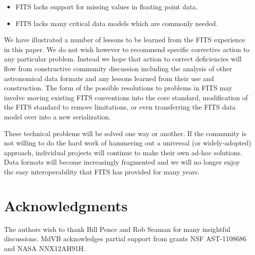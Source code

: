 \documentclass[final,authoryear,5p,times,twocolumn]{elsarticle}
\begin{document}
{{\begin{itemize}
\item FITS lacks support for missing values in floating point data.

\item FITS lacks many critical data models which are commonly needed.

\end{itemize}


We have illustrated a number of lessons to be learned from the FITS experience
in this paper. We do not wish however to recommend specific corrective action 
to any particular problem. Instead we hope that action to correct deficiencies 
will flow from constructive community discussion including the analysis of
other astronomical data formats and any lessons learned from their use
and construction.
The form of the possible resolutions to problems in FITS may involve moving 
existing FITS conventions into the core standard, modification of the FITS 
standard to remove limitations, or even transferring the FITS data model over
into a new serialization. 

These technical problems will be solved one way or another. If the
community is not willing to do the hard work of hammering out a
universal (or widely-adopted) approach, individual projects will
continue to make their own ad-hoc solutions. Data formats will become
increasingly fragmented and we will no longer enjoy the easy
interoperability that FITS has provided for many years.



\section{Acknowledgments}


The authors wish to thank Bill Pence and Rob Seaman for many insightful
discussions.
MdVB acknowledges partial support from grants NSF AST-1108686 and NASA
NNX12AH91H.




}}
\end{document}
